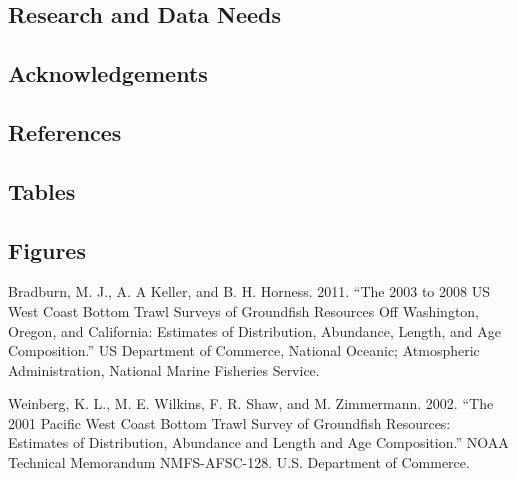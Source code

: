 \documentclass[
]{scrartcl}
\newlength{\cslhangindent}
\newenvironment{CSLReferences}[2] %
 {\begin{list}{}{%
  \setlength{\itemindent}{0pt}
  \setlength{\leftmargin}{0pt}
  \setlength{\parsep}{0pt}
  \ifodd #1
   \setlength{\leftmargin}{\cslhangindent}
   \setlength{\itemindent}{-1\cslhangindent}
  \fi
  \setlength{\itemsep}{#2\baselineskip}}}
 {\end{list}}
\begin{document}
\subsection{Research and Data Needs}\label{research-and-data-needs-1}

\newpage{}

\subsection{Acknowledgements}\label{sec-acknowledgements}

\newpage{}

\subsection{References}\label{references}

\newpage{}

\subsection{Tables}\label{tables}

\newpage{}

\subsection{Figures}\label{figures}

\label{refs}
\begin{CSLReferences}{1}{0}
Bradburn, M. J., A. A Keller, and B. H. Horness. 2011. {``The 2003 to
2008 {US} {West} {Coast} Bottom Trawl Surveys of Groundfish Resources
Off {Washington}, {Oregon}, and {California}: Estimates of Distribution,
Abundance, Length, and Age Composition.''} US Department of Commerce,
National Oceanic; Atmospheric Administration, National Marine Fisheries
Service.

Weinberg, K. L., M. E. Wilkins, F. R. Shaw, and M. Zimmermann. 2002.
{``The 2001 {Pacific} {West} {Coast} Bottom Trawl Survey of Groundfish
Resources: Estimates of Distribution, Abundance and Length and Age
Composition.''} NOAA Technical Memorandum NMFS-AFSC-128. U.S. Department
of Commerce.

\end{CSLReferences}
\end{document}
